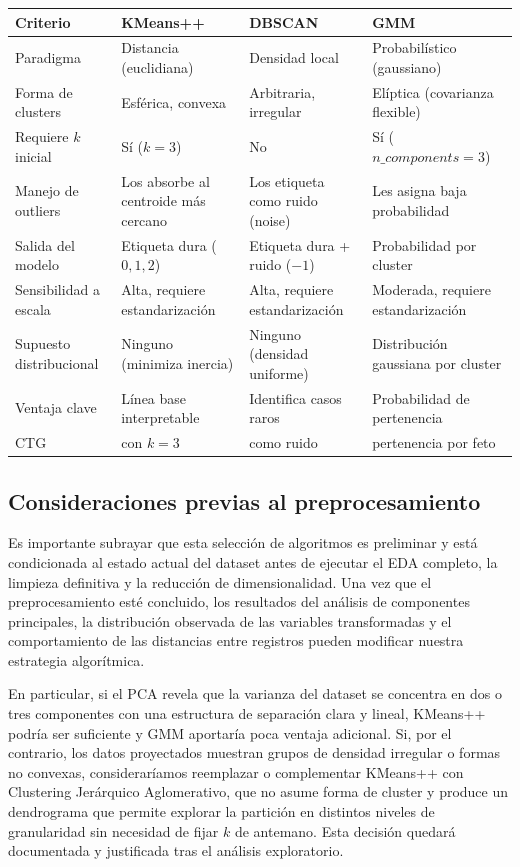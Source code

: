 \documentclass[12pt,letterpaper]{article}
\renewcommand{\arraystretch}{1.30}
\begin{document}
\begin{table}[H]
\centering
\small
\renewcommand{\arraystretch}{1.3}
\begin{tabular}{|p{3.5cm}|p{3.5cm}|p{3.5cm}|p{4cm}|}
\hline
\rowcolor{headbg}
\textbf{Criterio} & \textbf{K\-Means++} & \textbf{DBSCAN} & \textbf{GMM} \\
\hline
Paradigma & Distancia (euclidiana) & Densidad local & Probabilístico (gaussiano) \\
\hline
Forma de clusters & Esférica, convexa & Arbitraria, irregular & Elíptica (covarianza flexible) \\
\hline
Requiere $k$ inicial & Sí ($k = 3$) & No & Sí ($n\_components = 3$) \\
\hline
Manejo de outliers & Los absorbe al centroide más cercano & Los etiqueta como ruido (noise) & Les asigna baja probabilidad \\
\hline
Salida del modelo & Etiqueta dura ($0, 1, 2$) & Etiqueta dura + ruido ($-1$) & Probabilidad por cluster \\
\hline
Sensibilidad a escala & Alta, requiere estandarización & Alta, requiere estandarización & Moderada, requiere estandarización \\
\hline
Supuesto distribucional & Ninguno (minimiza inercia) & Ninguno (densidad uniforme) & Distribución gaussiana por cluster \\
\hline
Ventaja clave & Línea base interpretable & Identifica casos raros & Probabilidad de pertenencia \\
\hline
CTG & con $k = 3$ & como ruido & pertenencia por feto \\
\hline
\end{tabular}
\end{table}

\subsection{Consideraciones previas al preprocesamiento}

Es importante subrayar que esta selección de algoritmos es preliminar y está condicionada al estado
actual del dataset antes de ejecutar el EDA completo, la limpieza definitiva y la reducción de
dimensionalidad. Una vez que el preprocesamiento esté concluido, los resultados del análisis de
componentes principales, la distribución observada de las variables transformadas y el
comportamiento de las distancias entre registros pueden modificar nuestra estrategia algorítmica.

En particular, si el PCA revela que la varianza del dataset se concentra en dos o tres componentes
con una estructura de separación clara y lineal, K\-Means++ podría ser suficiente y GMM aportaría
poca ventaja adicional. Si, por el contrario, los datos proyectados muestran grupos de densidad
irregular o formas no convexas, consideraríamos reemplazar o complementar K\-Means++ con Clustering
Jerárquico Aglomerativo, que no asume forma de cluster y produce un dendrograma que permite
explorar la partición en distintos niveles de granularidad sin necesidad de fijar $k$ de antemano.
Esta decisión quedará documentada y justificada tras el análisis exploratorio.
\end{document}
